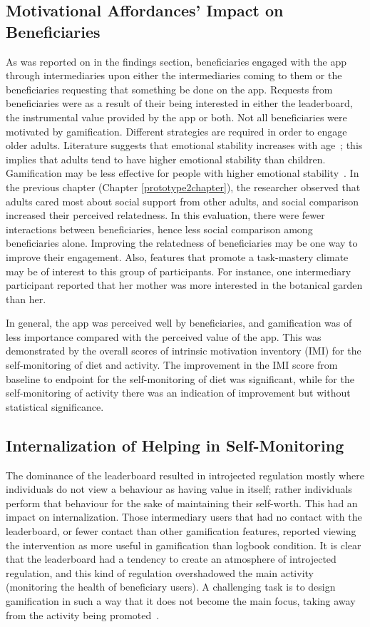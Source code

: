 \subsection{Motivational Affordances' Impact on Beneficiaries}
As was reported on in the findings section, beneficiaries engaged with the app through intermediaries upon either the intermediaries coming to them or the beneficiaries requesting that something be done on the app. Requests from beneficiaries were as a result of their being interested in either the leaderboard, the instrumental value provided by the app or both. Not all beneficiaries were motivated by gamification. Different strategies are required in order to engage older adults. Literature suggests that emotional stability increases with age~\citep{carstensen2011emotional}; this implies that adults tend to have higher emotional stability than children. Gamification may be less effective for people with higher emotional stability~\citep{jia2016personality}. In the previous chapter (Chapter \ref{prototype2chapter}), the researcher observed that adults cared most about social support from other adults, and social comparison increased their perceived relatedness. In this evaluation, there were fewer interactions between beneficiaries, hence less social comparison among beneficiaries alone. Improving the relatedness of beneficiaries may be one way to improve their engagement. Also, features that promote a task-mastery climate may be of interest to this group of participants. For instance, one intermediary participant reported that her mother was more interested in the botanical garden than her. 

In general, the app was perceived well by beneficiaries, and gamification was of less importance compared with the perceived value of the app. This was demonstrated by the overall scores of intrinsic motivation inventory (IMI) for the self-monitoring of diet and activity. The improvement in the IMI score from baseline to endpoint for the self-monitoring of diet was significant, while for the self-monitoring of activity there was an indication of improvement but without statistical significance.
\subsection{Internalization of Helping in Self-Monitoring}
The dominance of the leaderboard resulted in introjected regulation mostly where individuals do not view a behaviour as  having value in itself; rather individuals perform that behaviour for the sake of maintaining their self-worth. This had an impact on internalization. Those intermediary users that had no contact with the leaderboard, or fewer contact than other gamification features, reported viewing the intervention as more useful in gamification than logbook condition. It is clear that the leaderboard had a tendency to create an atmosphere of introjected regulation, and this kind of regulation overshadowed the main activity (monitoring the health of beneficiary users). A challenging task is to design gamification in such a way that it does not become the main focus, taking away from the activity being promoted~\citep{knaving2013designing}.

